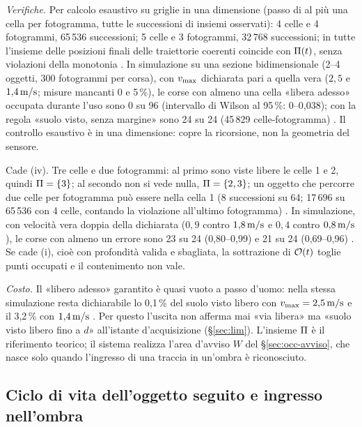 \emph{Verifiche.} Per calcolo esaustivo su griglie in una dimensione (passo di al più una cella per fotogramma, tutte le successioni di insiemi osservati): 4 celle e 4 fotogrammi, 65\,536 successioni; 5 celle e 3 fotogrammi, 32\,768 successioni; in tutte l'insieme delle posizioni finali delle traiettorie coerenti coincide con $\Pi(t)$, senza violazioni della monotonia . In simulazione su una sezione bidimensionale (2--4 oggetti, 300 fotogrammi per corsa), con $v_{\max}$ dichiarata pari a quella vera ($2{,}5$ e $1{,}4\,\mathrm{m/s}$; misure mancanti 0 e 5\,\%), le corse con almeno una cella «libera adesso» occupata durante l'uso sono 0 su 96 (intervallo di Wilson al 95\,\%: 0--0,038); con la regola «suolo visto, senza margine» sono 24 su 24 (45\,829 celle-fotogramma) . Il controllo esaustivo è in una dimensione: copre la ricorsione, non la geometria del sensore.

\begin{controesempio}\label{ce:occ-velocita}
Cade (iv). Tre celle e due fotogrammi: al primo sono viste libere le celle 1 e 2, quindi $\Pi=\{3\}$; al secondo non si vede nulla, $\Pi=\{2,3\}$; un oggetto che percorre due celle per fotogramma può essere nella cella 1 (8 successioni su 64; 17\,696 su 65\,536 con 4 celle, contando la violazione all'ultimo fotogramma) . In simulazione, con velocità vera doppia della dichiarata ($0{,}9$ contro $1{,}8\,\mathrm{m/s}$ e $0{,}4$ contro $0{,}8\,\mathrm{m/s}$), le corse con almeno un errore sono 23 su 24 (0,80--0,99) e 21 su 24 (0,69--0,96) . Se cade (i), cioè con profondità valida e sbagliata, la sottrazione di $\mathcal{O}(t)$ toglie punti occupati e il contenimento non vale.
\end{controesempio}

\emph{Costo.} Il «libero adesso» garantito è quasi vuoto a passo d'uomo: nella stessa simulazione resta dichiarabile lo 0,1\,\% del suolo visto libero con $v_{\max}=2{,}5\,\mathrm{m/s}$ e il 3,2\,\% con $1{,}4\,\mathrm{m/s}$ . Per questo l'uscita non afferma mai «via libera» ma «suolo visto libero fino a $d$» all'istante d'acquisizione (\S\ref{sec:lim}). L'insieme $\Pi$ è il riferimento teorico; il sistema realizza l'area d'avviso $W$ del \S\ref{sec:occ-avviso}, che nasce solo quando l'ingresso di una traccia in un'ombra è riconosciuto.

\subsection{Ciclo di vita dell'oggetto seguito e ingresso nell'ombra}\label{sec:occ-ciclo}

